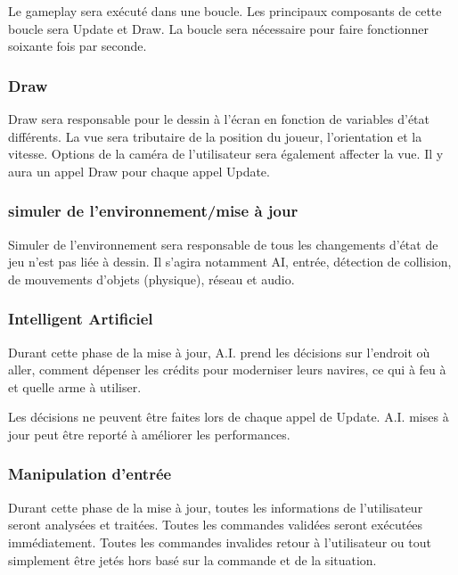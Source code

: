 Le gameplay sera exécuté dans une boucle. Les principaux composants de cette boucle sera Update et Draw. La boucle sera nécessaire pour faire fonctionner soixante fois par seconde.


\subsubsection{Draw} %
\label{ssub:draw}
Draw sera responsable pour le dessin à l'écran en fonction de variables d'état différents. La vue sera tributaire de la position du joueur, l'orientation et la vitesse. Options de la caméra de l'utilisateur sera également affecter la vue. Il y aura un appel Draw pour chaque appel Update.

\subsubsection{simuler de l'environnement/mise à jour} %
\label{ssub:subsubsection_name}

Simuler de l'environnement sera responsable de tous les changements d'état de jeu n'est pas liée à dessin. Il s'agira notamment AI, entrée, détection de collision, de mouvements d'objets (physique), réseau et audio.



\subsubsection{Intelligent Artificiel} %
\label{ssub:a_i_décisions_}
Durant cette phase de la mise à jour, A.I. prend les décisions sur l'endroit où aller, comment dépenser les crédits pour moderniser leurs navires, ce qui à feu à et quelle arme à utiliser. 

Les décisions ne peuvent être faites lors de chaque appel de Update. A.I. mises à jour peut être reporté à améliorer les performances.


\subsubsection{Manipulation d'entrée} %
\label{ssub:manipulation_d_entrée}

Durant cette phase de la mise à jour, toutes les informations de l'utilisateur seront analysées et traitées. Toutes les commandes validées seront exécutées immédiatement. Toutes les commandes invalides retour à l'utilisateur ou tout simplement être jetés hors basé sur la commande et de la situation. 


